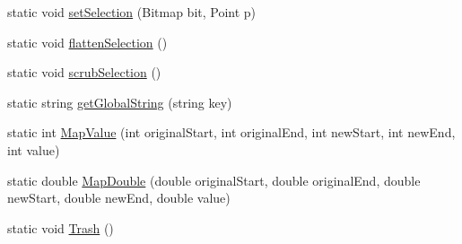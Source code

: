 \begin{DoxyCompactItemize}
\item 
static void \mbox{\hyperlink{class_paint___program_1_1_shared_settings_a82c13bff49c5cab0dd5bd71324b3009d}{set\+Selection}} (Bitmap bit, Point p)
\item 
static void \mbox{\hyperlink{class_paint___program_1_1_shared_settings_a9d0c5bb676b27571cb09eb2084080c47}{flatten\+Selection}} ()
\item 
static void \mbox{\hyperlink{class_paint___program_1_1_shared_settings_aa165f705923c332e6b22615041e0b8e5}{scrub\+Selection}} ()
\item 
static string \mbox{\hyperlink{class_paint___program_1_1_shared_settings_a54ced3e416efa336a7f04cdeee35d5fc}{get\+Global\+String}} (string key)
\item 
static int \mbox{\hyperlink{class_paint___program_1_1_shared_settings_a8888d4d35894d5e48c2f977c707e3a2b}{Map\+Value}} (int original\+Start, int original\+End, int new\+Start, int new\+End, int value)
\item 
static double \mbox{\hyperlink{class_paint___program_1_1_shared_settings_a02cecb7db8a0a2fed2286b8f91b009ce}{Map\+Double}} (double original\+Start, double original\+End, double new\+Start, double new\+End, double value)
\item 
static void \mbox{\hyperlink{class_paint___program_1_1_shared_settings_ac1e553031de8a07c0956d574946cb65e}{Trash}} ()
\end{DoxyCompactItemize}
